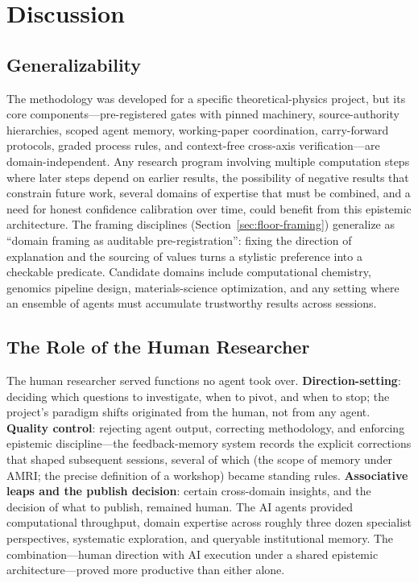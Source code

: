 \documentclass[12pt,a4paper]{article}
\begin{document}
\section{Discussion}
\label{sec:discussion}

\subsection{Generalizability}

The methodology was developed for a specific theoretical-physics project, but its core components---pre-registered gates with pinned machinery, source-authority hierarchies, scoped agent memory, working-paper coordination, carry-forward protocols, graded process rules, and context-free cross-axis verification---are domain-independent. Any research program involving multiple computation steps where later steps depend on earlier results, the possibility of negative results that constrain future work, several domains of expertise that must be combined, and a need for honest confidence calibration over time, could benefit from this epistemic architecture. The framing disciplines (Section~\ref{sec:floor-framing}) generalize as ``domain framing as auditable pre-registration'': fixing the direction of explanation and the sourcing of values turns a stylistic preference into a checkable predicate. Candidate domains include computational chemistry, genomics pipeline design, materials-science optimization, and any setting where an ensemble of agents must accumulate trustworthy results across sessions.

\subsection{The Role of the Human Researcher}

The human researcher served functions no agent took over. \textbf{Direction-setting}: deciding which questions to investigate, when to pivot, and when to stop; the project's paradigm shifts originated from the human, not from any agent. \textbf{Quality control}: rejecting agent output, correcting methodology, and enforcing epistemic discipline---the feedback-memory system records the explicit corrections that shaped subsequent sessions, several of which (the scope of memory under AMRI; the precise definition of a workshop) became standing rules. \textbf{Associative leaps and the publish decision}: certain cross-domain insights, and the decision of what to publish, remained human. The AI agents provided computational throughput, domain expertise across roughly three dozen specialist perspectives, systematic exploration, and queryable institutional memory. The combination---human direction with AI execution under a shared epistemic architecture---proved more productive than either alone.
\end{document}

